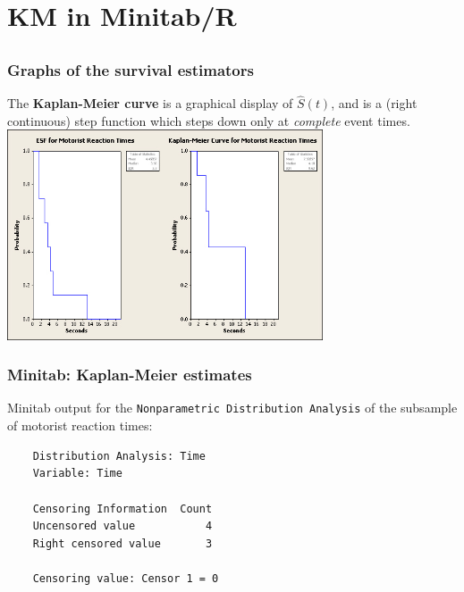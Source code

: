 \section[KM in Minitab/R]{KM in Minitab/R}
\subsection{}
\begin{frame}
\end{frame}

\begin{frame}
\frametitle{Graphs of the survival estimators}
The \textbf{Kaplan-Meier curve} is a graphical display of $\widehat{S}(t)$, and is a (right continuous) step function which steps down only at \textit{complete} event times.\\
\vskip5pt
\includegraphics[width=0.70\textwidth]{Figures/esf_km_motorist.jpg}
\end{frame}


\begin{frame}[fragile]
\frametitle{Minitab: Kaplan-Meier estimates}
Minitab output for the \texttt{Nonparametric Distribution Analysis} of the subsample of motorist reaction times:
\vskip10pt
\begin{verbatim}
    Distribution Analysis: Time
    Variable: Time

    Censoring Information  Count
    Uncensored value           4
    Right censored value       3

    Censoring value: Censor 1 = 0
\end{verbatim}
\end{frame}

